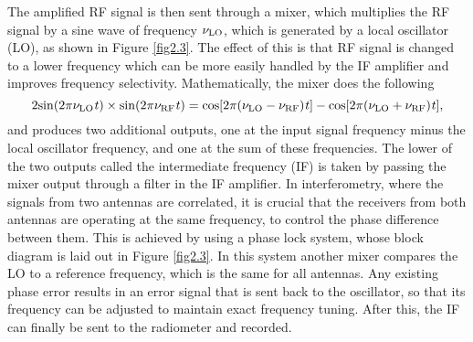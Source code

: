 The amplified RF signal is then sent through a mixer, which multiplies the RF signal by a sine wave of frequency $\nu _{\rm{LO}}$, which is generated by a local oscillator (LO), as shown in Figure \ref{fig2.3}. The effect of this is that RF signal is changed to a lower frequency which can be more easily handled by the IF amplifier and  improves frequency selectivity. Mathematically, the mixer does the following
\begin{equation}
2\rm{sin}(2\pi \nu _{\rm{LO}}\mathit{t})\times \rm{sin}(2\pi \nu _{\rm{RF}}\mathit{t}) = \rm{cos}[2\pi (\nu _{\rm{LO}}-\nu _{\rm{RF}})\mathit{t}]-\rm{cos}[2\pi (\nu _{\rm{LO}}+\nu _{\rm{RF}})\mathit{t}],
\end{equation}
and produces two additional outputs, one at the input signal frequency minus the local oscillator frequency, and one at the sum of these frequencies. The lower of the two outputs called the intermediate frequency (IF) is taken by passing the mixer output through a filter in the IF amplifier. In interferometry, where the signals from two antennas are correlated, it is crucial that the receivers from both antennas are operating at the same frequency, to control the phase difference between them. This is achieved by using a phase lock system, whose block diagram is laid out in Figure \ref{fig2.3}. In this system another mixer compares the LO to a reference frequency, which is the same for all antennas. Any existing phase error results in an error signal that is sent back to the oscillator, so that its frequency can be adjusted to maintain exact frequency tuning. After this, the IF can finally be sent to the radiometer and recorded.

